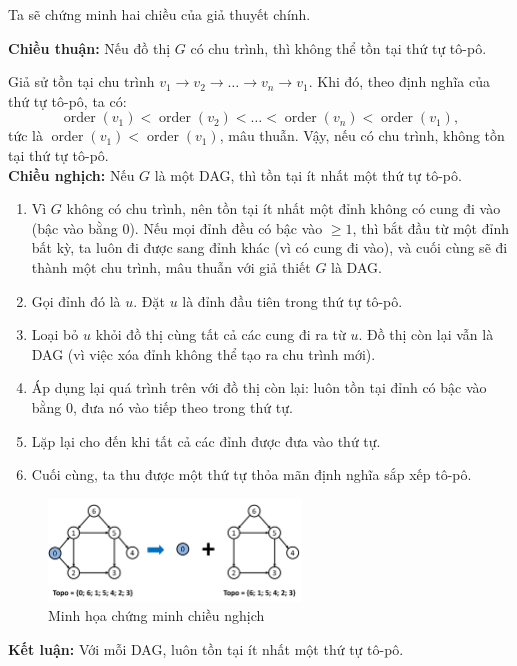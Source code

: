 \begin{chungminh}
Ta sẽ chứng minh hai chiều của giả thuyết chính.

\textbf{Chiều thuận:} Nếu đồ thị \( G \) có chu trình, thì không thể tồn tại thứ tự tô-pô.

Giả sử tồn tại chu trình \( v_1 \to v_2 \to \dots \to v_n \to v_1 \). Khi đó, theo định nghĩa của thứ tự tô-pô, ta có:
\[
\operatorname{order}(v_1) < \operatorname{order}(v_2) < \dots < \operatorname{order}(v_n) < \operatorname{order}(v_1),
\]
tức là \( \operatorname{order}(v_1) < \operatorname{order}(v_1) \), mâu thuẫn. Vậy, nếu có chu trình, không tồn tại thứ tự tô-pô.\\

\textbf{Chiều nghịch:} Nếu \( G \) là một DAG, thì tồn tại ít nhất một thứ tự tô-pô.

\begin{enumerate}
    \item Vì \( G \) không có chu trình, nên tồn tại ít nhất một đỉnh không có cung đi vào (bậc vào bằng 0). Nếu mọi đỉnh đều có bậc vào \(\geq 1\), thì bắt đầu từ một đỉnh bất kỳ, ta luôn đi được sang đỉnh khác (vì có cung đi vào), và cuối cùng sẽ đi thành một chu trình, mâu thuẫn với giả thiết \( G \) là DAG.

    \item Gọi đỉnh đó là \( u \). Đặt \( u \) là đỉnh đầu tiên trong thứ tự tô-pô.

    \item Loại bỏ \( u \) khỏi đồ thị cùng tất cả các cung đi ra từ \( u \). Đồ thị còn lại vẫn là DAG (vì việc xóa đỉnh không thể tạo ra chu trình mới).

    \item Áp dụng lại quá trình trên với đồ thị còn lại: luôn tồn tại đỉnh có bậc vào bằng 0, đưa nó vào tiếp theo trong thứ tự.

    \item Lặp lại cho đến khi tất cả các đỉnh được đưa vào thứ tự.

    \item Cuối cùng, ta thu được một thứ tự thỏa mãn định nghĩa sắp xếp tô-pô.
\end{enumerate}

\begin{figure}[H]
    \centering
    \includegraphics[width=0.6\textwidth]{resource/img/b2/topological_sort_img2.png}
    \caption{Minh họa chứng minh chiều nghịch}
\end{figure}
\textbf{Kết luận:} Với mỗi DAG, luôn tồn tại ít nhất một thứ tự tô-pô.
\end{chungminh}


